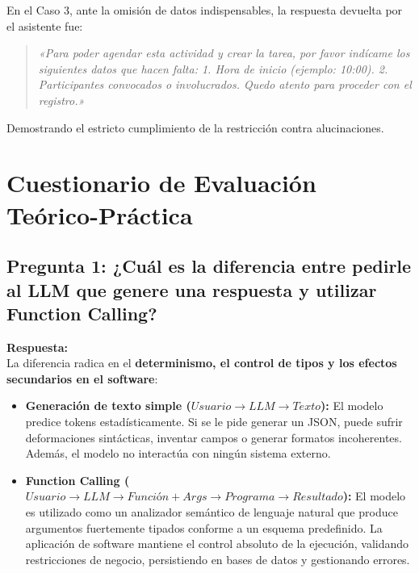 \documentclass[11pt,a4paper]{article}
\begin{document}
En el Caso 3, ante la omisión de datos indispensables, la respuesta devuelta por el asistente fue:
\begin{quote}
\textit{«Para poder agendar esta actividad y crear la tarea, por favor indícame los siguientes datos que hacen falta: 1. Hora de inicio (ejemplo: 10:00). 2. Participantes convocados o involucrados. Quedo atento para proceder con el registro.»}
\end{quote}
Demostrando el estricto cumplimiento de la restricción contra alucinaciones.

\section{Cuestionario de Evaluación Teórico-Práctica}

\subsection{Pregunta 1: ¿Cuál es la diferencia entre pedirle al LLM que genere una respuesta y utilizar Function Calling?}
\noindent\textbf{Respuesta:}\\
La diferencia radica en el \textbf{determinismo, el control de tipos y los efectos secundarios en el software}:
\begin{itemize}
    \item \textbf{Generación de texto simple ($Usuario \rightarrow LLM \rightarrow Texto$):} El modelo predice tokens estadísticamente. Si se le pide generar un JSON, puede sufrir deformaciones sintácticas, inventar campos o generar formatos incoherentes. Además, el modelo no interactúa con ningún sistema externo.
    \item \textbf{Function Calling ($Usuario \rightarrow LLM \rightarrow Función + Args \rightarrow Programa \rightarrow Resultado$):} El modelo es utilizado como un analizador semántico de lenguaje natural que produce argumentos fuertemente tipados conforme a un esquema predefinido. La aplicación de software mantiene el control absoluto de la ejecución, validando restricciones de negocio, persistiendo en bases de datos y gestionando errores.
\end{itemize}
\end{document}
